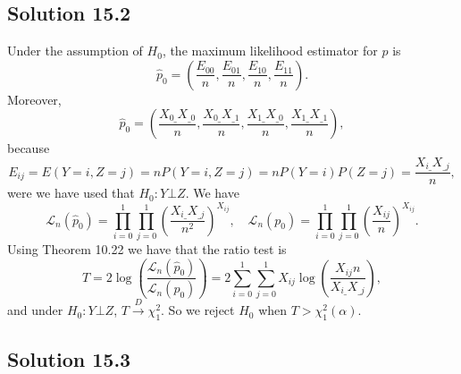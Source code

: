 \subsection*{Solution 15.2}

Under the assumption of $H_0$, the maximum likelihood estimator for $p$ is
\begin{equation*}
    \hat{p}_0 = \left(\frac{E_{00}}{n}, \frac{E_{01}}{n}, \frac{E_{10}}{n}, \frac{E_{11}}{n}\right).
\end{equation*}
Moreover,
\begin{equation*}
    \hat{p}_0 = \left(\frac{X_{0\_}X_{\_0}}{n}, \frac{X_{0\_}X_{\_1}}{n}, \frac{X_{1\_}X_{\_0}}{n}, \frac{X_{1\_}X_{\_1}}{n}\right),
\end{equation*}
because
\begin{equation*}
    E_{ij} = E(Y=i, Z=j)
        = n P(Y=i, Z=j)
        = n P(Y=i) P(Z=j)
        = \frac{X_{i\_}X_{\_j}}{n},
\end{equation*}
were we have used that $H_0: Y \bot Z$.
We have
\begin{equation*}
    \mathcal{L}_n(\hat{p}_0) = \prod_{i=0}^1 \prod_{j=0}^1 \left(\frac{X_{i\_}X_{\_j}}{n^2}\right)^{X_{ij}}, \quad
    \mathcal{L}_n(p_0) = \prod_{i=0}^1 \prod_{j=0}^1 \left(\frac{X_{ij}}{n}\right)^{X_{ij}}.
\end{equation*}
Using Theorem 10.22 we have that the ratio test is
\begin{equation*}
    T = 2\log\left(\frac{\mathcal{L}_n(\hat{p}_0)}{\mathcal{L}_n(p_0)}\right)
        = 2 \sum_{i=0}^1 \sum_{j=0}^1 X_{ij} \log\left(\frac{X_{ij} n}{X_{i\_}X_{\_j}}\right),
\end{equation*}
and under $H_0: Y \bot Z$, $T \xrightarrow{D} \chi_1^2$.
So we reject $H_0$ when $T > \chi_1^2(\alpha)$.


\subsection*{Solution 15.3}

